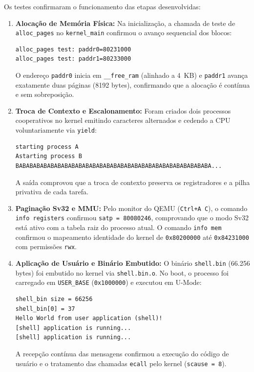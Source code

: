 \documentclass[12pt]{article}
\begin{document}
Os testes confirmaram o funcionamento das etapas desenvolvidas:
\begin{enumerate}
    \item \textbf{Alocação de Memória Física:} Na inicialização, a chamada de teste de \texttt{alloc\_pages} no \texttt{kernel\_main} confirmou o avanço sequencial dos blocos:
\begin{verbatim}
alloc_pages test: paddr0=80231000
alloc_pages test: paddr1=80233000
\end{verbatim}
    O endereço \texttt{paddr0} inicia em \texttt{\_\_free\_ram} (alinhado a 4~KB) e \texttt{paddr1} avança exatamente duas páginas (8192 bytes), confirmando que a alocação é contínua e sem sobreposição.

    \item \textbf{Troca de Contexto e Escalonamento:} Foram criados dois processos cooperativos no kernel emitindo caracteres alternados e cedendo a CPU voluntariamente via \texttt{yield}:
\begin{verbatim}
starting process A
Astarting process B
BABABABABABABABABABABABABABABABABABABABABABABABABABABABA...
\end{verbatim}
    A saída comprovou que a troca de contexto preserva os registradores e a pilha privativa de cada tarefa.

    \item \textbf{Paginação Sv32 e MMU:} Pelo monitor do QEMU (\texttt{Ctrl+A C}), o comando \texttt{info registers} confirmou \texttt{satp = 80080246}, comprovando que o modo Sv32 está ativo com a tabela raiz do processo atual. O comando \texttt{info mem} confirmou o mapeamento identidade do kernel de \texttt{0x80200000} até \texttt{0x84231000} com permissões \texttt{rwx}.

    \item \textbf{Aplicação de Usuário e Binário Embutido:} O binário \texttt{shell.bin} (66.256 bytes) foi embutido no kernel via \texttt{shell.bin.o}. No boot, o processo foi carregado em \texttt{USER\_BASE} (\texttt{0x1000000}) e executou em U-Mode:
\begin{verbatim}
shell_bin size = 66256
shell_bin[0] = 37
Hello World from user application (shell)!
[shell] application is running...
[shell] application is running...
\end{verbatim}
    A recepção contínua das mensagens confirmou a execução do código de usuário e o tratamento das chamadas \texttt{ecall} pelo kernel (\texttt{scause = 8}).


\end{enumerate}
\end{document}
